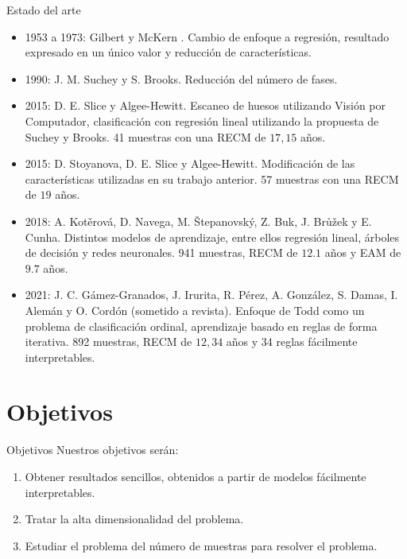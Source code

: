 \documentclass{beamer}
\begin{document}
\begin{frame}[allowframebreaks]{Estado del arte}

\begin{itemize}
\item 1953 a 1973: Gilbert y McKern \cite{propuestaGilbert}. Cambio de enfoque a regresión, resultado expresado en un único valor y reducción de características.

\item 1990: J. M. Suchey y S. Brooks. Reducción del número de fases.

\item 2015: D. E. Slice y Algee-Hewitt. Escaneo de huesos utilizando Visión por Computador, clasificación con regresión lineal utilizando la propuesta de Suchey y Brooks. 41 muestras con una RECM de $17,15$ años.

\item 2015: D. Stoyanova, D. E. Slice y Algee-Hewitt. Modificación de las características utilizadas en su trabajo anterior. 57 muestras con una RECM de $19$ años.

\item 2018: A. Kotěrová, D. Navega, M. Štepanovský, Z. Buk, J. Brůžek y E. Cunha. Distintos modelos de aprendizaje, entre ellos regresión lineal, árboles de decisión y redes neuronales. 941 muestras, RECM de $12.1$ años y EAM de $9.7$ años.

\item 2021: J. C. Gámez-Granados, J. Irurita, R. Pérez, A. González, S. Damas, I. Alemán y O. Cordón (sometido a revista). Enfoque de Todd como un problema de clasificación ordinal, aprendizaje basado en reglas de forma iterativa. 892 muestras, RECM de $12,34$ años y 34 reglas fácilmente interpretables.

\end{itemize}

\end{frame}


\section{Objetivos}
\begin{frame}{Objetivos}
Nuestros objetivos serán:

\begin{enumerate}
	\item Obtener resultados sencillos, obtenidos a partir de modelos fácilmente interpretables.
	\item Tratar la alta dimensionalidad del problema.
	\item Estudiar el problema del número de muestras para resolver el problema.
\end{enumerate}

\end{frame}
\end{document}
